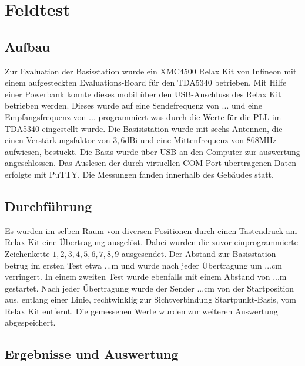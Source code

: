 \chapter{Feldtest}
\label{sec:Feldtest}
\pagestyle{scrheadings}
\section{Aufbau}
Zur Evaluation der Basisstation wurde ein  XMC4500 Relax Kit von Infineon mit einem aufgesteckten Evaluations-Board für den TDA5340 betrieben. Mit Hilfe einer Powerbank konnte dieses mobil über den \ac{USB}-Anschluss des Relax Kit betrieben werden. %
Dieses wurde auf eine Sendefrequenz von $...$ und eine Empfangsfrequenz von $...$ programmiert was durch die Werte für die \ac{PLL} im TDA5340 eingestellt wurde. 
Die Basisistation wurde mit sechs Antennen, die einen Verstärkungsfaktor von $3,6$dBi und eine Mittenfrequenz von $868$MHz aufwiesen, bestückt. Die Basis wurde über \ac{USB} an den Computer zur auswertung angeschlossen. Das Auslesen der durch virtuellen COM-Port übertragenen Daten erfolgte mit  PuTTY. Die Messungen fanden innerhalb des Gebäudes statt.
\section{Durchführung}
Es wurden  im selben Raum von diversen Positionen durch einen Tastendruck am Relax Kit eine Übertragung ausgelöst. Dabei wurden die zuvor einprogrammierte Zeichenkette $1,2,3,4,5,6,7,8,9$ ausgesendet. Der Abstand zur Basisstation betrug im ersten Test etwa $...$m und wurde nach jeder Übertragung um $...$cm verringert.
In einem zweiten Test wurde ebenfalls mit einem Abstand von $...$m gestartet.  Nach jeder Übertragung wurde der Sender $...$cm  von der Startposition aus, entlang einer  Linie, rechtwinklig zur Sichtverbindung Startpunkt-Basis, vom Relax Kit entfernt. Die gemessenen Werte wurden zur weiteren Auswertung abgespeichert.
\section{Ergebnisse und Auswertung}